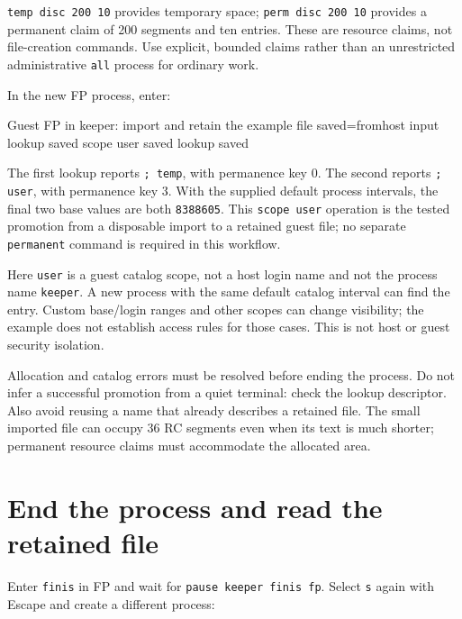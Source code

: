 \passthrough{\lstinline!temp disc 200 10!} provides temporary space; \passthrough{\lstinline!perm disc 200 10!} provides a permanent claim of 200 segments and ten entries. These are resource claims, not file-creation commands. Use explicit, bounded claims rather than an unrestricted administrative \passthrough{\lstinline!all!} process for ordinary work.

In the new FP process, enter:

\begin{commandexample}{Guest FP in keeper: import and retain the example file}
saved=fromhost input
lookup saved
scope user saved
lookup saved
\end{commandexample}

The first lookup reports \passthrough{\lstinline!; temp!}, with permanence key 0. The second reports \passthrough{\lstinline!; user!}, with permanence key 3. With the supplied default process intervals, the final two base values are both \passthrough{\lstinline!8388605!}. This \passthrough{\lstinline!scope user!} operation is the tested promotion from a disposable import to a retained guest file; no separate \passthrough{\lstinline!permanent!} command is required in this workflow.

Here \passthrough{\lstinline!user!} is a guest catalog scope, not a host login name and not the process name \passthrough{\lstinline!keeper!}. A new process with the same default catalog interval can find the entry. Custom base/login ranges and other scopes can change visibility; the example does not establish access rules for those cases. This is not host or guest security isolation.

Allocation and catalog errors must be resolved before ending the process. Do not infer a successful promotion from a quiet terminal: check the lookup descriptor. Also avoid reusing a name that already describes a retained file. The small imported file can occupy 36 RC segments even when its text is much shorter; permanent resource claims must accommodate the allocated area.

\section{End the process and read the retained file}\label{end-the-process-and-read-the-retained-file}

Enter \passthrough{\lstinline!finis!} in FP and wait for \passthrough{\lstinline!pause keeper finis fp!}. Select \passthrough{\lstinline!s!} again with Escape and create a different process:

